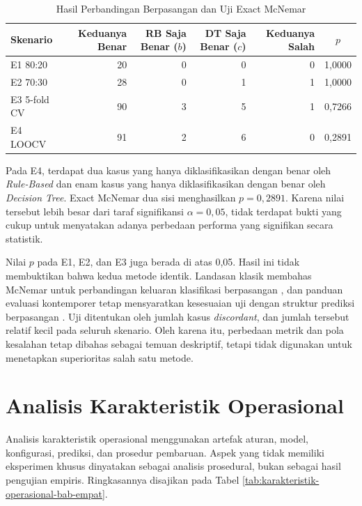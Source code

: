 \begin{table}[htbp]
    \centering
    \caption{Hasil Perbandingan Berpasangan dan Uji Exact McNemar}
    \label{tab:hasil-mcnemar-bab-empat}
    \scriptsize
    \renewcommand{\arraystretch}{1.2}
    \begin{tabular}{lrrrrc}
        \toprule
        \textbf{Skenario} & \textbf{Keduanya Benar} & \textbf{RB Saja Benar ($b$)} & \textbf{DT Saja Benar ($c$)} & \textbf{Keduanya Salah} & \textbf{$p$} \\
        \midrule
        E1 80:20 & 20 & 0 & 0 & 0 & 1,0000 \\
        E2 70:30 & 28 & 0 & 1 & 1 & 1,0000 \\
        E3 5-fold CV & 90 & 3 & 5 & 1 & 0,7266 \\
        E4 LOOCV & 91 & 2 & 6 & 0 & 0,2891 \\
        \bottomrule
    \end{tabular}
\end{table}

Pada E4, terdapat dua kasus yang hanya diklasifikasikan dengan benar oleh \textit{Rule-Based} dan enam kasus yang hanya diklasifikasikan dengan benar oleh \textit{Decision Tree}. Exact McNemar dua sisi menghasilkan \(p = 0{,}2891\). Karena nilai tersebut lebih besar dari taraf signifikansi \(\alpha = 0{,}05\), tidak terdapat bukti yang cukup untuk menyatakan adanya perbedaan performa yang signifikan secara statistik.

Nilai $p$ pada E1, E2, dan E3 juga berada di atas 0,05. Hasil ini tidak membuktikan bahwa kedua metode identik. Landasan klasik membahas McNemar untuk perbandingan keluaran klasifikasi berpasangan \cite{McNemar1947,Dietterich1998}, dan panduan evaluasi kontemporer tetap mensyaratkan kesesuaian uji dengan struktur prediksi berpasangan \cite{RainioEtAl2024}. Uji ditentukan oleh jumlah kasus \textit{discordant}, dan jumlah tersebut relatif kecil pada seluruh skenario. Oleh karena itu, perbedaan metrik dan pola kesalahan tetap dibahas sebagai temuan deskriptif, tetapi tidak digunakan untuk menetapkan superioritas salah satu metode.

\FloatBarrier

\section{Analisis Karakteristik Operasional}

Analisis karakteristik operasional menggunakan artefak aturan, model, konfigurasi, prediksi, dan prosedur pembaruan. Aspek yang tidak memiliki eksperimen khusus dinyatakan sebagai analisis prosedural, bukan sebagai hasil pengujian empiris. Ringkasannya disajikan pada Tabel \ref{tab:karakteristik-operasional-bab-empat}.

